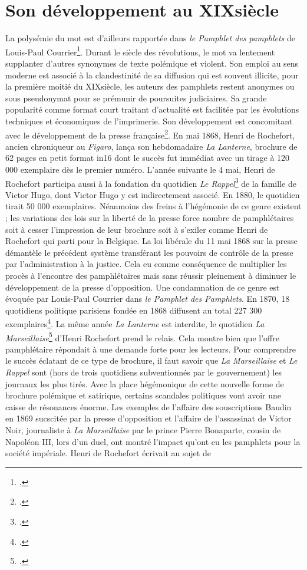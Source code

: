 \section{Son développement au XIX\ieme siècle}
La polysémie du mot est d'ailleurs rapportée dans \textit{le Pamphlet des pamphlets} de Louis-Paul Courrier\footcites{courier_pamphlet_1824}. Durant le siècle des révolutions, le mot va lentement supplanter d'autres synonymes de texte polémique et violent. Son emploi au sens moderne est associé à la clandestinité de sa diffusion qui est souvent illicite, pour la première moitié du XIX\ieme siècle, les auteurs des pamphlets restent anonymes ou sous pseudonymat pour se prémunir de poursuites judiciaires. Sa grande popularité comme format court traitant d'actualité est facilitée par les évolutions techniques et économiques de l'imprimerie. Son développement est concomitant avec le développement de la presse française\footcites{feyel_presse_2007}. En mai 1868, Henri de Rochefort, ancien chroniqueur au \textit{Figaro}, lança son hebdomadaire \textit{La Lanterne}, brochure de 62 pages en petit format in16 dont le succès fut immédiat avec un tirage à 120 000 exemplaire dès le premier numéro. L'année suivante le 4 mai, Henri de Rochefort participa aussi à la fondation du quotidien \textit{Le Rappel}\footcites{barbieux_rappel_1869} de la famille de Victor Hugo, dont Victor Hugo y est indirectement associé. En 1880, le quotidien tirait 50 000 exemplaires. Néanmoins des freins à l'hégémonie de ce genre existent ; les variations des lois sur la liberté de la presse force nombre de pamphlétaires soit à cesser l'impression de leur brochure soit à s'exiler comme Henri de Rochefort qui parti pour la Belgique. La loi libérale du 11 mai 1868 sur la presse démantèle le précédent système transférant les pouvoirs de contrôle de la presse par l'administration à la justice. Cela eu comme conséquence de multiplier les procès à l'encontre des pamphlétaires mais sans réussir pleinement à diminuer le développement de la presse d'opposition. Une condamnation de ce genre est évoquée par Louis-Paul Courrier dans \textit{le Pamphlet des Pamphlets}. En 1870, 18 quotidiens politique parisiens fondée en 1868 diffusent au total 227 300 exemplaires\footcites{feyel_presse_2007}. La même année \textit{La Lanterne} est interdite, le quotidien \textit{La Marseillaise}\footcites{noauthor_marseillaise_1877} d'Henri Rochefort prend le relais. Cela montre bien que l'offre pamphlétaire répondait à une demande forte pour les lecteurs. Pour comprendre le succès éclatant de ce type de brochure, il faut savoir que \textit{La Marseillaise} et \textit{Le Rappel} sont (hors de trois quotidiens subventionnés par le gouvernement) les journaux les plus tirés. Avec la place hégémonique de cette nouvelle forme de brochure polémique et satirique, certains scandales politiques vont avoir une caisse de résonances énorme. Les exemples de l'affaire des souscriptions Baudin en 1869 sucscitée par la presse d'opposition et l'affaire de l'assassinat de Victor Noir, journaliste à \textit{La Marseillaise} par le prince Pierre Bonaparte, cousin de Napoléon III, lors d'un duel, ont montré l'impact qu'ont eu les pamphlets pour la société impériale. Henri de Rochefort écrivait au sujet de 